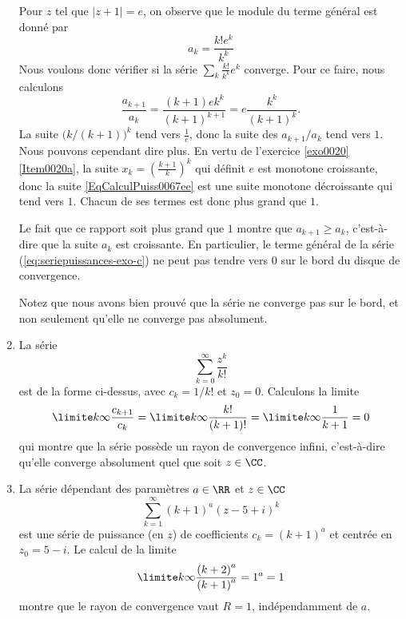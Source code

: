 \documentclass[12pt,french,oneside,a4paper]{memoir} %
\begin{document}
\begin{exo}
\begin{correction}
\begin{enumerate}
Pour $z$ tel que $| z+1 | = e$, on observe que le module du terme général est donné par
\begin{equation}
a_k = \frac{k! e^k}{k^k}
\end{equation}
Nous voulons donc vérifier si la série $\sum_k\frac{ k! }{ k^k }e^k$ converge. Pour ce faire, nous calculons
\begin{equation}\label{EqCalculPuiss0067ee}
	\frac{a_{k+1}}{a_k}=\frac{ (k+1)ek^k }{ (k+1)^{k+1} }=e\frac{ k^k }{ (k+1)^k }.
\end{equation}
La suite $\big( k/(k+1) \big)^k$ tend vers $\frac 1 e$, donc la suite des $a_{k+1}/a_k$ tend vers $1$. Nous pouvons cependant dire plus. En vertu de l'exercice \ref{exo0020}\ref{Item0020a}, la suite $x_k=\left( \frac{ k+1 }{ k } \right)^k$ qui définit $e$ est monotone croissante, donc la suite \eqref{EqCalculPuiss0067ee} est une suite monotone décroissante qui tend vers $1$. Chacun de ses termes est donc plus grand que $1$.


Le fait que ce rapport soit plus grand que $1$ montre que $a_{k+1} \geq a_k$, c'est-à-dire que la suite $a_k$ est croissante. En particulier, le terme général de la série (\ref{eq:seriepuissances-exo-c}) ne peut pas tendre vers $0$ sur le bord du disque de convergence.

Notez que nous avons bien prouvé que la série ne converge pas sur le bord, et non seulement qu'elle ne converge pas absolument.

\item La série
\begin{equation*}
	\sum_{k=0}^\infty \frac{z^k}{k!}
\end{equation*}
est de la forme ci-dessus, avec $c_k = 1/k!$ et $z_0 = 0$. Calculons la limite
\begin{equation*}
\limite k \infty \frac{c_{k+1}}{c_k} = \limite k\infty
\frac{k!}{(k+1)!} = \limite k\infty \frac{1}{k+1} = 0
\end{equation*}
qui montre que la série possède un rayon de convergence infini,
c'est-à-dire qu'elle converge absolument quel que soit $z \in \CC$.

\item La série dépendant des paramètres $a \in \RR$ et $z \in \CC$
\begin{equation*}
\sum_{k=1}^\infty {(k+1)}^a {(z- 5 + i)}^k
\end{equation*}
est une série de puissance (en $z$) de coefficients $c_k =
{(k+1)}^a$ et centrée en $z_0 = 5 - i$. Le calcul de la limite
\begin{equation*}
\limite k\infty \frac{{(k+2)}^a}{{(k+1)}^a} = 1^a = 1
\end{equation*}
montre que le rayon de convergence vaut $R = 1$, indépendamment de
$a$.


\end{enumerate}
\end{correction}
\end{exo}
\end{document}
